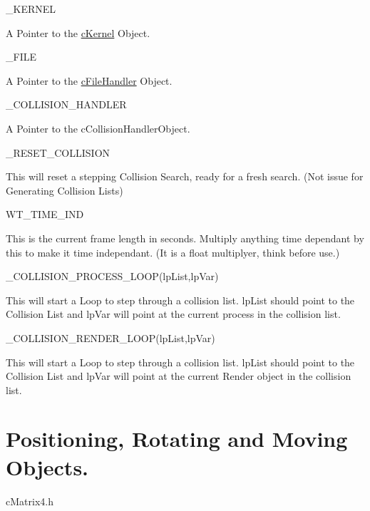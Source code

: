\begin{DoxyItemize}
\begin{DoxyItemize}
\end{DoxyItemize}
\item \_\-KERNEL
\begin{DoxyItemize}
\item A Pointer to the \hyperlink{classc_kernel}{cKernel} Object.
\end{DoxyItemize}
\item \_\-FILE
\begin{DoxyItemize}
\item A Pointer to the \hyperlink{classc_file_handler}{cFileHandler} Object.
\end{DoxyItemize}
\item \_\-COLLISION\_\-HANDLER
\begin{DoxyItemize}
\item A Pointer to the cCollisionHandlerObject.
\end{DoxyItemize}
\item \_\-RESET\_\-COLLISION
\begin{DoxyItemize}
\item This will reset a stepping Collision Search, ready for a fresh search. (Not issue for Generating Collision Lists)
\end{DoxyItemize}
\item WT\_\-TIME\_\-IND
\begin{DoxyItemize}
\item This is the current frame length in seconds. Multiply anything time dependant by this to make it time independant. (It is a float multiplyer, think before use.)\par

\end{DoxyItemize}
\item \_\-COLLISION\_\-PROCESS\_\-LOOP(lpList,lpVar)
\begin{DoxyItemize}
\item This will start a Loop to step through a collision list. lpList should point to the Collision List and lpVar will point at the current process in the collision list.\par

\end{DoxyItemize}
\item \_\-COLLISION\_\-RENDER\_\-LOOP(lpList,lpVar)
\begin{DoxyItemize}
\item This will start a Loop to step through a collision list. lpList should point to the Collision List and lpVar will point at the current Render object in the collision list.\par

\end{DoxyItemize}
\end{DoxyItemize}\hypertarget{_reference_lists_MatrixUsagePage}{}\section{Positioning, Rotating and Moving Objects.}\label{_reference_lists_MatrixUsagePage}
cMatrix4.h \par



